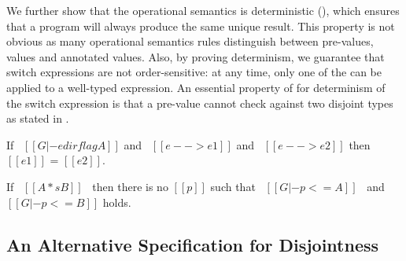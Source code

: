 We further show that the operational semantics is deterministic
(), which ensures
that a program will always produce the same unique result. This property is not
obvious as many operational semantics rules distinguish between pre-values,
values and annotated values. Also, by proving determinism, we guarantee that
switch expressions are not order-sensitive: at any time, only one of the
 can be applied to a well-typed expression.
An essential property of \cal for determinism of the switch expression is
that a pre-value cannot check against two disjoint types as stated in
.

\begin{theorem}[Determinism]
\label{lemma:union:determinism}
  If \ $[[G |- e dirflag A]]$ and \ $[[e --> e1]]$ and \ $[[e --> e2]]$ then $[[e1]]$ = $[[e2]]$.
\end{theorem}

\begin{comment}
\begin{proof}
  By induction on first reduction relation and inverting second reduction relation subsequently.
  All cases are trivial to solve by simple inversions except:
  \begin{itemize}
    \item Case \rref{typ-typeof} requires \cref{lemma:union:check-both-disj-false}.
  \end{itemize}
\end{proof}
\end{comment}

\begin{lemma}
\label{lemma:union:check-both-disj-false}
If \ $[[A *s B]]$ \ then there is no $[[p]]$ such that
\ $[[G |- p <= A]]$ \ and \ $[[G |- p <= B]]$ holds.
\end{lemma}



\subsection{An Alternative Specification for Disjointness}
\label{sec:union:discussion}
\begin{comment}
\snow{I feel the reason and consequence are flipped here.
The alternative spec definitely equals to the previous one
because we define ``ordinary types" to satisfy:
1) no bottom-like types are ordinary;
2) any type must have an ordinary subtype if it is not bottom-like.
Or we need to provide some intuition for ordinary types themselves.}
\end{comment}

